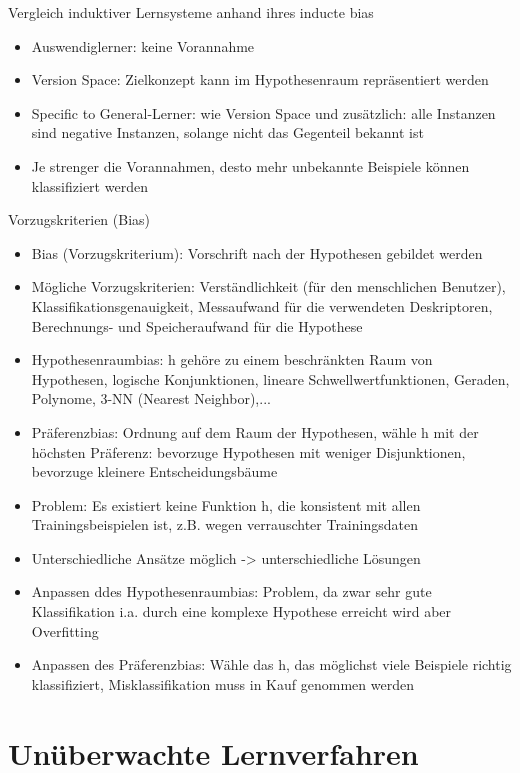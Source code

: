 \documentclass[paper=a4, fontsize=11pt]{scrartcl} %
\numberwithin{equation}{section} %
\numberwithin{figure}{section} %
\numberwithin{table}{section} %
\begin{document}
Vergleich induktiver Lernsysteme anhand ihres inducte bias
\begin{itemize}
\item Auswendiglerner: keine Vorannahme
\item Version Space: Zielkonzept kann im Hypothesenraum repräsentiert werden
\item Specific to General-Lerner: wie Version Space und zusätzlich: alle Instanzen sind negative Instanzen, solange nicht das Gegenteil bekannt ist
\item Je strenger die Vorannahmen, desto mehr unbekannte Beispiele können klassifiziert werden
\end{itemize}

Vorzugskriterien (Bias)
\begin{itemize}
\item Bias (Vorzugskriterium): Vorschrift nach der Hypothesen gebildet werden
\item Mögliche Vorzugskriterien: Verständlichkeit (für den menschlichen Benutzer), Klassifikationsgenauigkeit, Messaufwand für die verwendeten Deskriptoren, Berechnungs- und Speicheraufwand für die Hypothese
\item Hypothesenraumbias: h gehöre zu einem beschränkten Raum von Hypothesen, logische Konjunktionen, lineare Schwellwertfunktionen, Geraden, Polynome, 3-NN (Nearest Neighbor),...
\item Präferenzbias: Ordnung auf dem Raum der Hypothesen, wähle h mit der höchsten Präferenz: bevorzuge Hypothesen mit weniger Disjunktionen, bevorzuge kleinere Entscheidungsbäume
\item Problem: Es existiert keine Funktion h, die konsistent mit allen Trainingsbeispielen ist, z.B. wegen verrauschter Trainingsdaten
\item Unterschiedliche Ansätze möglich -> unterschiedliche Lösungen
\item Anpassen ddes Hypothesenraumbias: Problem, da zwar sehr gute Klassifikation i.a. durch eine komplexe Hypothese erreicht wird aber Overfitting
\item Anpassen des Präferenzbias: Wähle das h, das möglichst viele Beispiele richtig klassifiziert, Misklassifikation muss in Kauf genommen werden
\end{itemize}

\section{Unüberwachte Lernverfahren}
\end{document}
